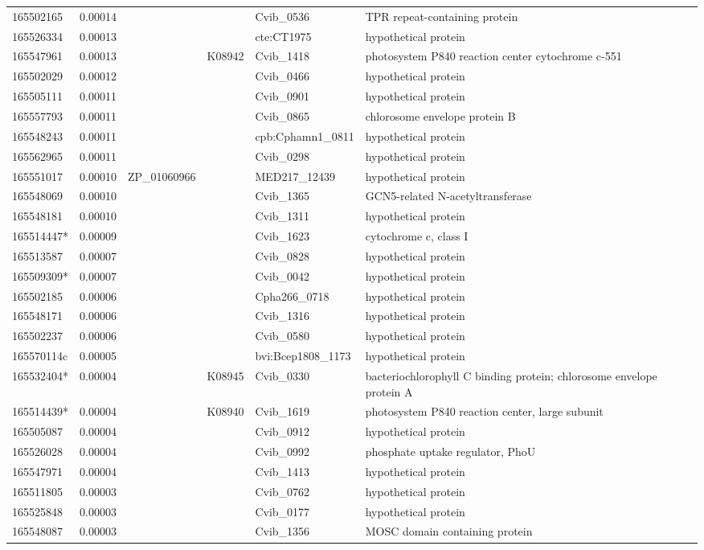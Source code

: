 \begin{landscape}
\begin{longtable}{p{1.8cm}p{0.9cm}p{2.2cm}p{1cm}p{2.8cm}p{13.4cm}}
165502165&0.00014&&&Cvib\_0536&TPR repeat-containing protein \\
165526334&0.00013&&&cte:CT1975&hypothetical protein \\
165547961&0.00013&&K08942&Cvib\_1418&photosystem P840 reaction center cytochrome c-551 \\
165502029&0.00012&&&Cvib\_0466&hypothetical protein \\
165505111&0.00011&&&Cvib\_0901&hypothetical protein \\
165557793&0.00011&&&Cvib\_0865&chlorosome envelope protein B \\
165548243&0.00011&&&cpb:Cphamn1\_0811&hypothetical protein \\
165562965&0.00011&&&Cvib\_0298&hypothetical protein \\
165551017&0.00010&ZP\_01060966&&MED217\_12439&hypothetical protein \\
165548069&0.00010&&&Cvib\_1365&GCN5-related N-acetyltransferase \\
165548181&0.00010&&&Cvib\_1311&hypothetical protein \\
165514447*&0.00009&&&Cvib\_1623&cytochrome c, class I \\
165513587&0.00007&&&Cvib\_0828&hypothetical protein \\
165509309*&0.00007&&&Cvib\_0042&hypothetical protein \\
165502185&0.00006&&&Cpha266\_0718&hypothetical protein \\
165548171&0.00006&&&Cvib\_1316&hypothetical protein \\
165502237&0.00006&&&Cvib\_0580&hypothetical protein \\
165570114c&0.00005&&&bvi:Bcep1808\_1173&hypothetical protein \\
165532404*&0.00004&&K08945&Cvib\_0330&bacteriochlorophyll C binding protein;  chlorosome envelope protein A \\
165514439*&0.00004&&K08940&Cvib\_1619&photosystem P840 reaction center, large subunit \\
165505087&0.00004&&&Cvib\_0912&hypothetical protein \\
165526028&0.00004&&&Cvib\_0992&phosphate uptake regulator, PhoU \\
165547971&0.00004&&&Cvib\_1413&hypothetical protein \\
165511805&0.00003&&&Cvib\_0762&hypothetical protein \\
165525848&0.00003&&&Cvib\_0177&hypothetical protein \\
165548087&0.00003&&&Cvib\_1356&MOSC domain containing protein \\

\end{longtable}
\end{landscape}
